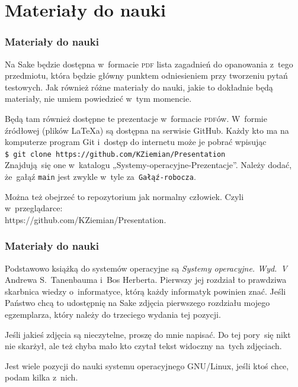 \documentclass[10pt,t]{beamer}
\begin{document}
\section{Materiały do nauki}


\begin{frame}
  \frametitle{Materiały do nauki}


  Na Sake będzie dostępna w~formacie \textsc{pdf} \alert{lista zagadnień do
    opanowania z~tego przedmiotu}, która będzie główny punktem odniesieniem
  przy tworzeniu pytań testowych. Jak również różne materiały do nauki,
  jakie to dokładnie będą materiały, nie umiem powiedzieć w~tym momencie.

  Będą tam również dostępne te prezentacje w~formacie \textsc{pdf}ów.
  W~formie źródłowej (plików \LaTeX a) są dostępna na serwisie GitHub.
  Każdy kto ma na komputerze program Git i~dostęp do internetu może je
  pobrać wpisując \\
  \texttt{\$ git clone https://github.com/KZiemian/Presentation} \\
  Znajdują~się one w~katalogu „Systemy-operacyjne-Prezentacje”. Należy
  dodać, że~gałąź \texttt{main} jest zwykle w~tyle
  za~\texttt{Gałąź-robocza}.

  Można też obejrzeć to repozytorium jak normalny człowiek. Czyli
  w~przeglądarce: \\
  {https://github.com/KZiemian/Presentation}.

\end{frame}





\begin{frame}
  \frametitle{Materiały do nauki}


  Podstawowo książką do systemów operacyjne są
  \textit{Systemy operacyjne. Wyd.~V} Andrewa S.~Tanenbauma i~Bos Herberta.
  Pierwszy jej rozdział to prawdziwa skarbnica wiedzy o~informatyce, którą
  każdy informatyk powinien znać. Jeśli Państwo chcą to udostępnię na Sake
  zdjęcia pierwszego rozdziału mojego egzemplarza, który należy do
  trzeciego wydania tej pozycji.

  Jeśli jakieś zdjęcia są nieczytelne, proszę do mnie napisać. Do tej
  pory~się nikt nie skarżył, ale też chyba mało kto czytał tekst widoczny
  na~tych zdjęciach.

  Jest wiele pozycji do nauki systemu operacyjnego GNU/Linux, jeśli ktoś
  chce, podam kilka z~nich.

\end{frame}
\end{document}
